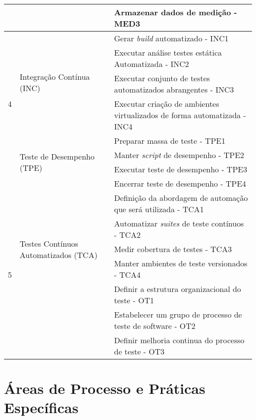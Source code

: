 \begin{table}[H]
{\begin{tabular}{|p{20mm}|p{76mm}|p{150mm}|}
    \cline{3-3}
        & & Armazenar dados de medição - MED3\\ 
    \hline
        \multirow{7}{*}{4}& 
        \multirow{4}{*}{Integração Contínua (INC)}& 
        Gerar \textit{build} automatizado - INC1\\ 
    \cline{3-3} 
        & & Executar análise testes estática Automatizada - INC2\\ 
    \cline{3-3}
        & & Executar conjunto de testes automatizados abrangentes - INC3\\ 
    \cline{3-3}
        & & Executar criação de ambientes virtualizados  de forma automatizada - INC4 \\ 

    \cline{2-3}
        & \multirow{4}{*}{Teste de Desempenho (TPE)}& 
        Preparar massa de teste - TPE1\\ 
    \cline{3-3}
        & & Manter \textit{script} de desempenho - TPE2\\ 
    \cline{3-3}
        & & Executar teste de desempenho - TPE3\\ 
    \cline{3-3}
        & & Encerrar teste de desempenho - TPE4\\ 
    \hline
        \multirow{8}{*}{5}&
        \multirow{5}{*}{Testes Contínuos Automatizados (TCA)}&
        Definição da abordagem de automação que será utilizada - TCA1\\ 
    \cline{3-3}
        & & Automatizar \textit{suites} de teste contínuos - TCA2\\
    \cline{3-3}
        & & Medir cobertura de testes - TCA3\\ 
    \cline{3-3}
        & & Manter ambientes de teste versionados - TCA4\\ 
    \cline{2-3}
        & \multirow{3}{*}{Otimização dos Teste (OT)}& 
        Definir a estrutura organizacional do teste - OT1\\
    \cline{3-3}
        & & Estabelecer um grupo de processo de teste de software - OT2\\ 
    \cline{3-3}
        & & Definir melhoria continua do processo de teste - OT3\\ 
    \hline
    \end{tabular}
}
\end{table}


\section{Áreas de Processo e Práticas Específicas}
\label{sec:areasdeprocessoepraticas}



